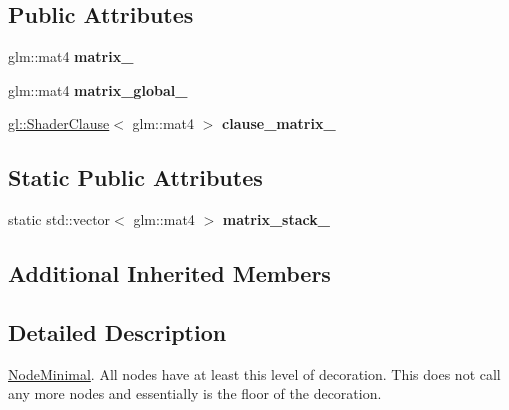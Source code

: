 \subsection*{Public Attributes}
\begin{DoxyCompactItemize}
\item 
\hypertarget{classs9_1_1NodeMinimal_a12d6d58b516bf19b596e2a6fdaca2686}{glm\-::mat4 {\bfseries matrix\-\_\-}}\label{classs9_1_1NodeMinimal_a12d6d58b516bf19b596e2a6fdaca2686}

\item 
\hypertarget{classs9_1_1NodeMinimal_afcfa1f514f73a35f4368e2b9747690c7}{glm\-::mat4 {\bfseries matrix\-\_\-global\-\_\-}}\label{classs9_1_1NodeMinimal_afcfa1f514f73a35f4368e2b9747690c7}

\item 
\hypertarget{classs9_1_1NodeMinimal_a344ef2f806c2fed88b2e608bb8f532e4}{\hyperlink{structs9_1_1gl_1_1ShaderClause}{gl\-::\-Shader\-Clause}$<$ glm\-::mat4 $>$ {\bfseries clause\-\_\-matrix\-\_\-}}\label{classs9_1_1NodeMinimal_a344ef2f806c2fed88b2e608bb8f532e4}

\end{DoxyCompactItemize}
\subsection*{Static Public Attributes}
\begin{DoxyCompactItemize}
\item 
\hypertarget{classs9_1_1NodeMinimal_a09e4b79b4a0cb4933072148d67b038b9}{static std\-::vector$<$ glm\-::mat4 $>$ {\bfseries matrix\-\_\-stack\-\_\-}}\label{classs9_1_1NodeMinimal_a09e4b79b4a0cb4933072148d67b038b9}

\end{DoxyCompactItemize}
\subsection*{Additional Inherited Members}


\subsection{Detailed Description}
\hyperlink{classs9_1_1NodeMinimal}{Node\-Minimal}. All nodes have at least this level of decoration. This does not call any more nodes and essentially is the floor of the decoration. 

